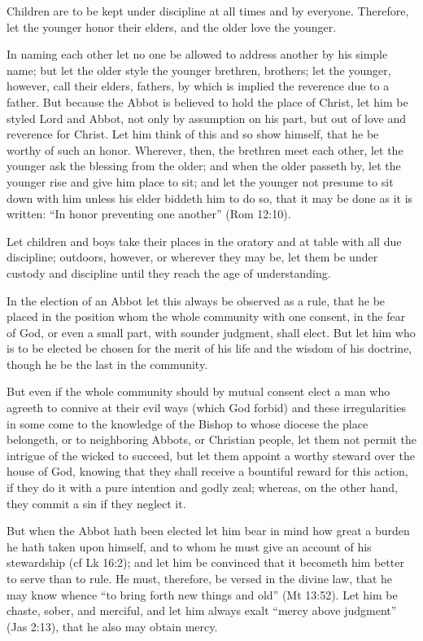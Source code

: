 Children are to be kept under discipline at all times and by everyone. Therefore, let the younger honor their elders, and the older love the younger.

In naming each other let no one be allowed to address another by his simple name; but let the older style the younger brethren, brothers; let the younger, however, call their elders, fathers, by which is implied the reverence due to a father. But because the Abbot is believed to hold the place of Christ, let him be styled Lord and Abbot, not only by assumption on his part, but out of love and reverence for Christ. Let him think of this and so show himself, that he be worthy of such an honor. Wherever, then, the brethren meet each other, let the younger ask the blessing from the older; and when the older passeth by, let the younger rise and give him place to sit; and let the younger not presume to sit down with him unless his elder biddeth him to do so, that it may be done as it is written: ``In honor preventing one another'' (Rom 12:10).

Let children and boys take their places in the oratory and at table with all due discipline; outdoors, however, or wherever they may be, let them be under custody and discipline until they reach the age of understanding.


In the election of an Abbot let this always be observed as a rule, that he be placed in the position whom the whole community with one consent, in the fear of God, or even a small part, with sounder judgment, shall elect. But let him who is to be elected be chosen for the merit of his life and the wisdom of his doctrine, though he be the last in the community.

But even if the whole community should by mutual consent elect a man who agreeth to connive at their evil ways (which God forbid) and these irregularities in some come to the knowledge of the Bishop to whose diocese the place belongeth, or to neighboring Abbots, or Christian people, let them not permit the intrigue of the wicked to succeed, but let them appoint a worthy steward over the house of God, knowing that they shall receive a bountiful reward for this action, if they do it with a pure intention and godly zeal; whereas, on the other hand, they commit a sin if they neglect it.

But when the Abbot hath been elected let him bear in mind how great a burden he hath taken upon himself, and to whom he must give an account of his stewardship (cf Lk 16:2); and let him be convinced that it becometh him better to serve than to rule. He must, therefore, be versed in the divine law, that he may know whence ``to bring forth new things and old'' (Mt 13:52). Let him be chaste, sober, and merciful, and let him always exalt ``mercy above judgment'' (Jas 2:13), that he also may obtain mercy.

